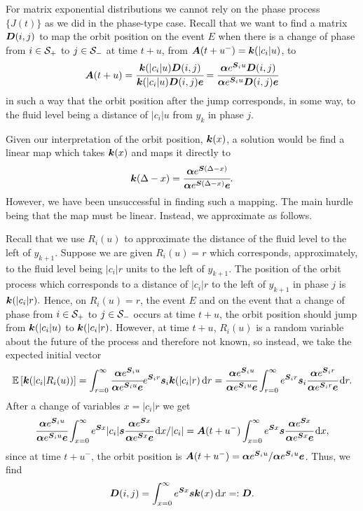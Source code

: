 For matrix exponential distributions we cannot rely on the phase process \(\{J(t)\}\) as we did in the phase-type case. Recall that we want to find a matrix \(\boldsymbol D(i,j)\) to map the orbit position on the event \(E\) when there is a change of phase from \(i\in\mathcal{S}_+\) to \(j\in\mathcal{S}_-\) at time \(t+u\), from \(\boldsymbol A(t+u^-) = \boldsymbol k(|c_i|u)\), to 
\[\boldsymbol A(t+u) = \cfrac{\boldsymbol k(|c_i|u)\boldsymbol D(i,j)}{\boldsymbol k(|c_i|u)\boldsymbol D(i,j)\boldsymbol e}=\cfrac{\boldsymbol\alpha e^{\boldsymbol S_iu} \boldsymbol D(i,j)}{\boldsymbol\alpha e^{\boldsymbol S_iu}\boldsymbol D(i,j)\boldsymbol e}\]
in such a way that the orbit position after the jump corresponds, in some way, to the fluid level being a distance of \(|c_i|u\) from \(y_k\) in phase \(j\).

Given our interpretation of the orbit position, \(\boldsymbol k(x)\), a solution would be find a linear map which takes \(\boldsymbol k(x)\) and maps it directly to 
\[\boldsymbol k(\Delta-x) = \cfrac{\boldsymbol\alpha e^{\boldsymbol S(\Delta-x)} }{\boldsymbol\alpha e^{\boldsymbol S(\Delta-x) } \boldsymbol e}.\] However, we have been unsuccessful in finding such a mapping. The main hurdle being that the map must be linear. Instead, we approximate as follows.

Recall that we use \(R_i(u)\) to approximate the distance of the fluid level to the left of \(y_{k+1}\). Suppose we are given \(R_i(u)=r\) which corresponds, approximately, to the fluid level being \(|c_i|r\) units to the left of \(y_{k+1}\). The position of the orbit process which corresponds to a distance of \(|c_i|r\) to the left of \(y_{k+1}\) in phase \(j\) is \(\boldsymbol k(|c_i|r).\)
Hence, on \(R_i(u)=r\), the event \(E\) and on the event that a change of phase from \(i\in\mathcal{S}_+\) to \(j\in\mathcal{S}_-\) occurs at time \(t+u\), the orbit position should jump from \(\boldsymbol k(|c_i|u)\) to \(\boldsymbol k(|c_i|r)\). However, at time \(t+u\), \(R_i(u)\) is a random variable about the future of the process and therefore not known, so instead, we take the expected initial vector 
\[\mathbb E \left[ \boldsymbol k(|c_i|R_i(u))\right] = \int_{r=0}^\infty \cfrac{\boldsymbol\alpha e^{\boldsymbol S_i u } }{\boldsymbol\alpha e^{\boldsymbol S_iu } \boldsymbol e} e^{\boldsymbol S_ir } \boldsymbol s_i \boldsymbol k(|c_i|r)\, \mathrm{d} r = \cfrac{\boldsymbol\alpha e^{\boldsymbol S_i u } }{\boldsymbol\alpha e^{\boldsymbol S_iu } \boldsymbol e} \int_{r=0}^\infty e^{\boldsymbol S_ir } \boldsymbol s_i\cfrac{\boldsymbol\alpha e^{ \boldsymbol S_ir } }{\boldsymbol\alpha e^{ \boldsymbol S_ir } \boldsymbol e}\, \mathrm{d} r.\]
After a change of variables \(x=|c_i|r\) we get 
\[\cfrac{\boldsymbol\alpha e^{\boldsymbol S_i u } }{\boldsymbol\alpha e^{\boldsymbol S_iu } \boldsymbol e} \int_{x=0}^\infty e^{\boldsymbol S x }|c_i| \boldsymbol s \cfrac{\boldsymbol\alpha e^{ \boldsymbol Sx } }{\boldsymbol\alpha e^{ \boldsymbol Sx } \boldsymbol e}\, \mathrm{d} x/|c_i| = \boldsymbol A(t+u^-)\int_{x=0}^\infty e^{\boldsymbol S x }\boldsymbol s \cfrac{\boldsymbol\alpha e^{ \boldsymbol Sx } }{\boldsymbol\alpha e^{ \boldsymbol Sx } \boldsymbol e}\, \mathrm{d} x,\]
since at time \(t+u^-\), the orbit position is \(\boldsymbol A(t+u^-) = {\boldsymbol\alpha e^{\boldsymbol S_i u } }/{\boldsymbol\alpha e^{\boldsymbol S_iu } \boldsymbol e}\). Thus, we find 
\[\boldsymbol D(i,j)=\displaystyle \int_{x=0}^\infty e^{\boldsymbol S x }\boldsymbol s \boldsymbol k(x)\, \mathrm{d} x=:\boldsymbol D.\]

